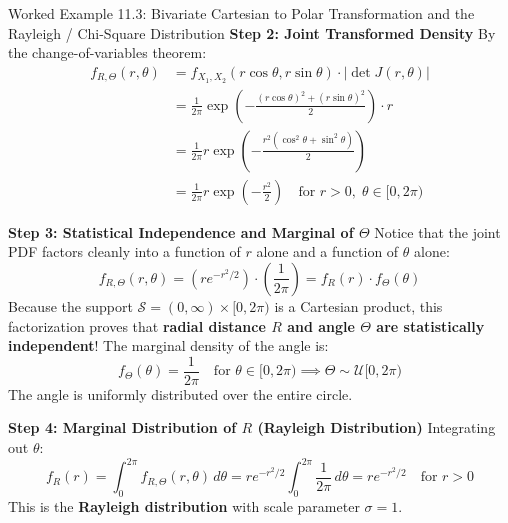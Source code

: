 \begin{examplebox}[breakable]{Worked Example 11.3: Bivariate Cartesian to Polar Transformation and the Rayleigh / Chi-Square Distribution}
\textbf{Step 2: Joint Transformed Density}
By the change-of-variables theorem:
\begin{align}
f_{R, \Theta}(r, \theta) &= f_{X_1, X_2}(r\cos\theta, r\sin\theta) \cdot |\det J(r, \theta)| \nonumber \\
&= \frac{1}{2\pi} \exp\left( -\frac{(r\cos\theta)^2 + (r\sin\theta)^2}{2} \right) \cdot r \nonumber \\
&= \frac{1}{2\pi} r \exp\left( -\frac{r^2(\cos^2\theta + \sin^2\theta)}{2} \right) \nonumber \\
&= \frac{1}{2\pi} r \exp\left( -\frac{r^2}{2} \right) \quad \text{for } r > 0, \; \theta \in [0, 2\pi)
\end{align}

\textbf{Step 3: Statistical Independence and Marginal of $\Theta$}
Notice that the joint PDF factors cleanly into a function of $r$ alone and a function of $\theta$ alone:
\begin{equation}
f_{R, \Theta}(r, \theta) = \left( r e^{-r^2/2} \right) \cdot \left( \frac{1}{2\pi} \right) = f_R(r) \cdot f_\Theta(\theta)
\end{equation}
Because the support $\mathcal{S} = (0, \infty) \times [0, 2\pi)$ is a Cartesian product, this factorization proves that \textbf{radial distance $R$ and angle $\Theta$ are statistically independent}!
The marginal density of the angle is:
\begin{equation}
f_\Theta(\theta) = \frac{1}{2\pi} \quad \text{for } \theta \in [0, 2\pi) \implies \Theta \sim \mathcal{U}[0, 2\pi)
\end{equation}
The angle is uniformly distributed over the entire circle.

\textbf{Step 4: Marginal Distribution of $R$ (Rayleigh Distribution)}
Integrating out $\theta$:
\begin{equation}
f_R(r) = \int_0^{2\pi} f_{R, \Theta}(r, \theta) \, d\theta = r e^{-r^2/2} \int_0^{2\pi} \frac{1}{2\pi} \, d\theta = r e^{-r^2/2} \quad \text{for } r > 0
\end{equation}
This is the \textbf{Rayleigh distribution} with scale parameter $\sigma = 1$.


\end{examplebox}
